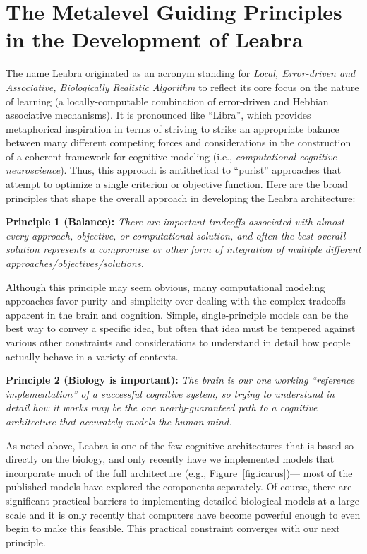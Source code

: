 \documentclass[11pt,twoside]{article}
\begin{document}
\section{The Metalevel Guiding Principles in the Development of Leabra}

The name Leabra originated as an acronym standing for {\em Local, Error-driven
  and Associative, Biologically Realistic Algorithm} to reflect its core focus
on the nature of learning (a locally-computable combination of error-driven
and Hebbian associative mechanisms). It is pronounced like ``Libra'', which
provides metaphorical inspiration in terms of striving to strike an
appropriate balance between many different competing forces and considerations
in the construction of a coherent framework for cognitive modeling (i.e., {\em
  computational cognitive neuroscience}).  Thus, this approach is antithetical
to ``purist'' approaches that attempt to optimize a single criterion or
objective function.  Here are the broad principles that shape the overall
approach in developing the Leabra architecture:

{\bf Principle 1 (Balance):} {\em There are important tradeoffs associated
  with almost every approach, objective, or computational solution, and often
  the best overall solution represents a compromise or other form of
  integration of multiple different approaches/objectives/solutions.}

Although this principle may seem obvious, many computational modeling
approaches favor purity and simplicity over dealing with the complex tradeoffs
apparent in the brain and cognition.  Simple, single-principle models can be
the best way to convey a specific idea, but often that idea must be tempered
against various other constraints and considerations to understand in detail
how people actually behave in a variety of contexts.

{\bf Principle 2 (Biology is important):} {\em The brain is our one working
  ``reference implementation'' of a successful cognitive system, so trying to
  understand in detail how it works may be the one nearly-guaranteed path to a
  cognitive architecture that accurately models the human mind.}

As noted above, Leabra is one of the few cognitive architectures that is based
so directly on the biology, and only recently have we implemented models that
incorporate much of the full architecture (e.g., Figure~\ref{fig.icarus})---
most of the published models have explored the components separately.  Of
course, there are significant practical barriers to implementing detailed
biological models at a large scale and it is only recently that computers have
become powerful enough to even begin to make this feasible.  This practical
constraint converges with our next principle.
\end{document}
